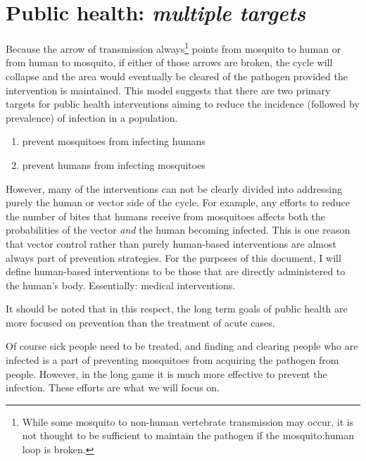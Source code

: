 \section{Public health: \emph{multiple targets}}


Because the arrow of transmission always\footnote{While some mosquito
  to non-human vertebrate transmission may occur, it is not thought to
  be sufficient to maintain the pathogen if the mosquito:human loop is
  broken.} points from mosquito to human or from human to mosquito, if either of those arrows are broken, the cycle will collapse and the area would eventually be cleared of the pathogen provided the intervention is maintained.
This model suggests that there are two primary targets for public health interventions aiming to reduce the \gls{incidence}
(followed by \gls{prevalence}) of infection in a population.

\begin{enumerate}
\item
  prevent mosquitoes from infecting humans
\item
  prevent humans from infecting mosquitoes
\end{enumerate}

However, many of the interventions can not be clearly divided into addressing purely the human or vector side of the cycle.
For example, any efforts to reduce the number of bites that humans receive from mosquitoes affects both the probabilities of the vector \emph{and} the human becoming infected.
This is one reason that vector control rather than purely human-based interventions are almost always part of prevention strategies.
For the purposes of this document, I will define human-based interventions to be those that are directly administered to the human's body.
Essentially: medical interventions.

It should be noted that in this respect, the long term goals of public health are more focused on prevention than the treatment of acute cases.

Of course sick people need to be treated, and finding and clearing people who are infected is a part of preventing mosquitoes from acquiring the pathogen from people.
However, in the long game it is much more effective to prevent the infection.
These efforts are what we will focus on.


